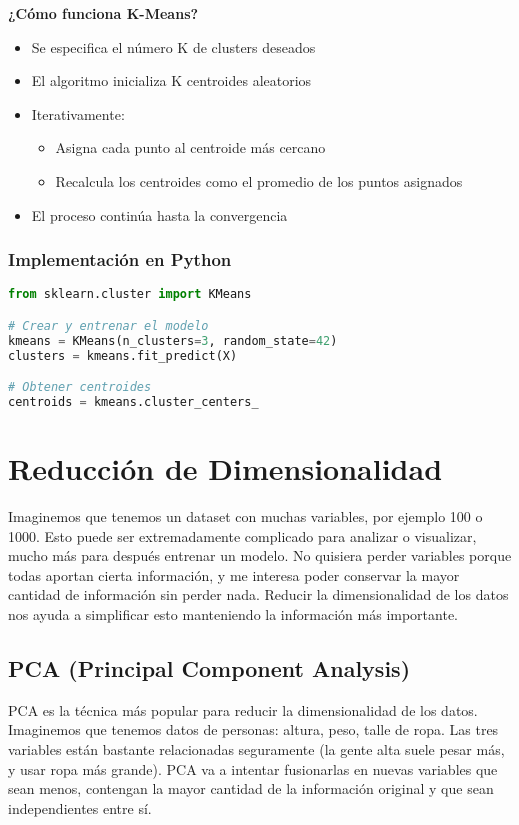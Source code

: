 \documentclass[12pt]{article}
\begin{document}
\vspace{1em}

\textbf{¿Cómo funciona K-Means?}
\begin{itemize}
    \item Se especifica el número K de clusters deseados
    \item El algoritmo inicializa K centroides aleatorios
    \item Iterativamente:
    \begin{itemize}
        \item Asigna cada punto al centroide más cercano
        \item Recalcula los centroides como el promedio de los puntos asignados
    \end{itemize}
    \item El proceso continúa hasta la convergencia
\end{itemize}

\subsubsection{Implementación en Python}

\begin{lstlisting}[language=Python]
from sklearn.cluster import KMeans

# Crear y entrenar el modelo
kmeans = KMeans(n_clusters=3, random_state=42)
clusters = kmeans.fit_predict(X)

# Obtener centroides
centroids = kmeans.cluster_centers_
\end{lstlisting}

\section{Reducción de Dimensionalidad}
Imaginemos que tenemos un dataset con muchas variables, por ejemplo 100 o 1000. Esto puede ser extremadamente complicado para analizar o visualizar, mucho más para después entrenar un modelo. No quisiera perder variables porque todas aportan cierta información, y me interesa poder conservar la mayor cantidad de información sin perder nada. Reducir la dimensionalidad de los datos nos ayuda a simplificar esto manteniendo la información más importante.

\subsection{PCA (Principal Component Analysis)}
PCA es la técnica más popular para reducir la dimensionalidad de los datos. Imaginemos que tenemos datos de personas: altura, peso, talle de ropa. Las tres variables están bastante relacionadas seguramente (la gente alta suele pesar más, y usar ropa más grande). PCA va a intentar fusionarlas en nuevas variables que sean menos, contengan la mayor cantidad de la información original y que sean independientes entre sí.
\end{document}
